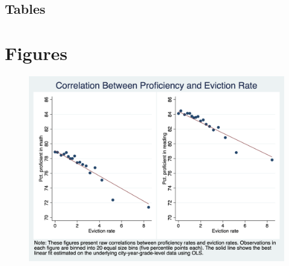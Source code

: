 \documentclass[12pt]{article}
\begin{document}
\singlespacing
\setlength\bibsep{0pt}





\clearpage

\onehalfspacing


\begin{landscape}
\section*{Tables} \label{sec:tab}

\end{landscape}




\newpage
\begin{landscape}

\end{landscape}


\clearpage

\section*{Figures} \label{sec:fig}

\begin{figure}[H]
    \centering
    \includegraphics[scale=0.4]{output/graphs/outcome_binscatter.png}
    \caption{}
    \label{fig:my_label}
\end{figure}
\end{document}
